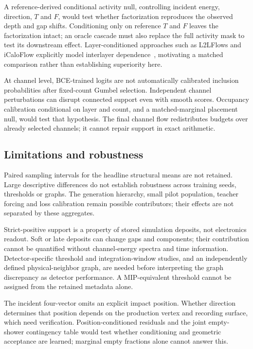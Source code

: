 \documentclass[11pt]{article}
\begin{document}
A reference-derived conditional activity null, controlling incident energy, direction, $T$ and $F$, would test whether factorization reproduces the observed depth and gap shifts. Conditioning only on reference $T$ and $F$ leaves the factorization intact; an oracle cascade must also replace the full activity mask to test its downstream effect. Layer-conditioned approaches such as L2LFlows and iCaloFlow explicitly model interlayer dependence~\cite{l2lflows,icaloflow}, motivating a matched comparison rather than establishing superiority here.

At channel level, BCE-trained logits are not automatically calibrated inclusion probabilities after fixed-count Gumbel selection. Independent channel perturbations can disrupt connected support even with smooth scores. Occupancy calibration conditional on layer and count, and a matched-marginal placement null, would test that hypothesis. The final channel flow redistributes budgets over already selected channels; it cannot repair support in exact arithmetic.

\subsection{Limitations and robustness}

Paired sampling intervals for the headline structural means are not retained. Large descriptive differences do not establish robustness across training seeds, thresholds or graphs. The generation hierarchy, small pilot population, teacher forcing and loss calibration remain possible contributors; their effects are not separated by these aggregates.

Strict-positive support is a property of stored simulation deposits, not electronics readout. Soft or late deposits can change gaps and components; their contribution cannot be quantified without channel-energy spectra and time information. Detector-specific threshold and integration-window studies, and an independently defined physical-neighbor graph, are needed before interpreting the graph discrepancy as detector performance. A MIP-equivalent threshold cannot be assigned from the retained metadata alone.

The incident four-vector omits an explicit impact position. Whether direction determines that position depends on the production vertex and recording surface, which need verification. Position-conditioned residuals and the joint empty-shower contingency table would test whether conditioning and geometric acceptance are learned; marginal empty fractions alone cannot answer this.
\end{document}

